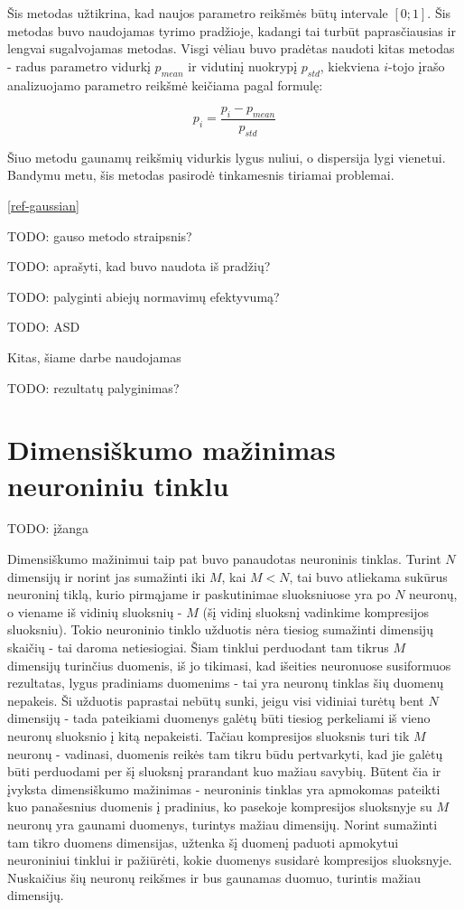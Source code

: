\documentclass{VUMIFPSbakalaurinis}
\newcommand{\TODO}[1]{
\colorbox{todo-background-color}{TODO: #1}
}
\begin{document}
Šis metodas užtikrina, kad naujos parametro reikšmės būtų intervale $[0; 1]$.
Šis metodas buvo naudojamas tyrimo pradžioje, kadangi tai turbūt paprasčiausias ir lengvai sugalvojamas metodas.
Visgi vėliau buvo pradėtas naudoti kitas metodas - radus parametro vidurkį $p_{mean}$ ir vidutinį nuokrypį $p_{std}$, kiekviena $i$-tojo įrašo analizuojamo parametro reikšmė keičiama pagal formulę:

\begin{equation}
p_i = \frac{p_i - p_{mean}}{p_{std}}
\end{equation}

Šiuo metodu gaunamų reikšmių vidurkis lygus nuliui, o dispersija lygi vienetui.
Bandymu metu, šis metodas pasirodė tinkamesnis tiriamai problemai.

\ref{ref-gaussian}

\cite{638621}
\TODO{gauso metodo straipsnis?}

\TODO{aprašyti, kad buvo naudota iš pradžių?}
\TODO{palyginti abiejų normavimų efektyvumą?}


\TODO{ASD}

Kitas, šiame darbe naudojamas



\TODO{rezultatų palyginimas?}



\section{Dimensiškumo mažinimas neuroniniu tinklu}


\TODO{įžanga}

Dimensiškumo mažinimui taip pat buvo panaudotas neuroninis tinklas.
Turint $N$ dimensijų ir norint jas sumažinti iki $M$, kai $M < N$, tai buvo atliekama sukūrus neuroninį tiklą, kurio pirmąjame ir paskutinimae sluoksniuose yra po $N$ neuronų, o viename iš vidinių sluoksnių - $M$ (šį vidinį sluoksnį vadinkime kompresijos sluoksniu).
Tokio neuroninio tinklo užduotis nėra tiesiog sumažinti dimensijų skaičių - tai daroma netiesiogiai.
Šiam tinklui perduodant tam tikrus $M$ dimensijų turinčius duomenis, iš jo tikimasi, kad išeities neuronuose susiformuos rezultatas, lygus pradiniams duomenims - tai yra neuronų tinklas šių duomenų nepakeis.
Ši užduotis paprastai nebūtų sunki, jeigu visi vidiniai turėtų bent $N$ dimensijų - tada pateikiami duomenys galėtų būti tiesiog perkeliami iš vieno neuronų sluoksnio į kitą nepakeisti.
Tačiau kompresijos sluoksnis turi tik $M$ neuronų - vadinasi, duomenis reikės tam tikru būdu pertvarkyti, kad jie galėtų būti perduodami per šį sluoksnį prarandant kuo mažiau savybių.
Būtent čia ir įvyksta dimensiškumo mažinimas - neuroninis tinklas yra apmokomas pateikti kuo panašesnius duomenis į pradinius, ko pasekoje kompresijos sluoksnyje su $M$ neuronų yra gaunami duomenys, turintys mažiau dimensijų.
Norint sumažinti tam tikro duomens dimensijas, užtenka šį duomenį paduoti apmokytui neuroniniui tinklui ir pažiūrėti, kokie duomenys susidarė kompresijos sluoksnyje.
Nuskaičius šių neuronų reikšmes ir bus gaunamas duomuo, turintis mažiau dimensijų.
\end{document}
